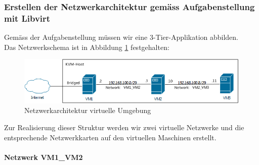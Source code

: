 

%
%
%


\subsubsection{Erstellen der Netzwerkarchitektur gemäss Aufgabenstellung mit Libvirt}

Gemäss der Aufgabenstellung müssen wir eine 3-Tier-Applikation abbilden. \hfill \\
Das Netzwerkschema ist in Abbildung \ref{fig:network}  festgehalten:

\begin{figure}[h]
	\centering
	\includegraphics[width=\linewidth]{appendix/kvm/network}
	\caption{Netzwerkarchitektur virtuelle Umgebung}
	\label{fig:network}
\end{figure}

Zur Realisierung dieser Struktur werden wir zwei virtuelle Netzwerke und die entsprechende Netzwerkkarten auf den virtuellen Maschinen erstellt.

\paragraph{Netzwerk VM1\_VM2} \hfill \\

